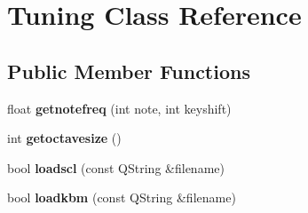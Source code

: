 \hypertarget{class_tuning}{}\section{Tuning Class Reference}
\label{class_tuning}
\subsection*{Public Member Functions}
\begin{DoxyCompactItemize}
\item 
\mbox{\label{class_tuning_a3e77daf75db04c0b8beb97238ed99658}} 
float {\bfseries getnotefreq} (int note, int keyshift)
\item 
\mbox{\label{class_tuning_af95827f85145afca4814724c76fcd82f}} 
int {\bfseries getoctavesize} ()
\item 
\mbox{\label{class_tuning_acfd6231f2e4c29f5a0a884e68570f720}} 
bool {\bfseries loadscl} (const Q\+String \&filename)
\item 
\mbox{\label{class_tuning_a706dd43886a0c562ce4adce12c6e9a17}} 
bool {\bfseries loadkbm} (const Q\+String \&filename)
\end{DoxyCompactItemize}
